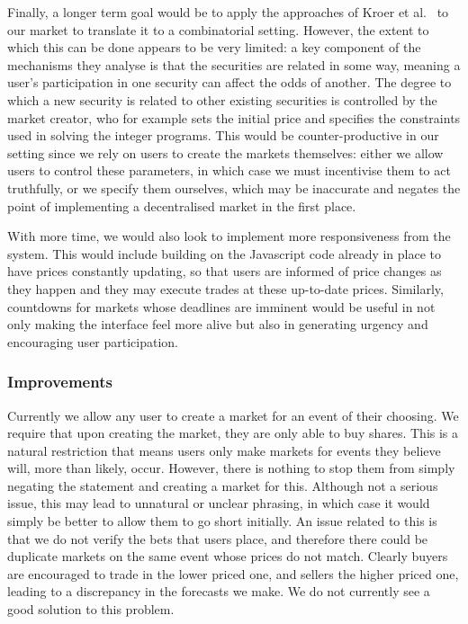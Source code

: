 Finally, a longer term goal would be to apply the approaches of Kroer et
al.~\cite{Kroer2016} to our market to translate it to a combinatorial setting.
However, the extent to which this can be done appears to be very limited: a key
component of the mechanisms they analyse is that the securities are related in
some way, meaning a user's participation in one security can affect the odds of
another. The degree to which a new security is related to other existing
securities is controlled by the market creator, who for example sets the
initial price and specifies the constraints used in solving the integer
programs. This would be counter-productive in our setting since we rely on
users to create the markets themselves: either we allow users to control these
parameters, in which case we must incentivise them to act truthfully, or we
specify them ourselves, which may be inaccurate and negates the point of
implementing a decentralised market in the first place.

With more time, we would also look to implement more responsiveness from the 
system. This would include building on the Javascript code already in place to
have prices constantly updating, so that users are informed of price changes as
they happen and they may execute trades at these up-to-date prices. Similarly,
countdowns for markets whose deadlines are imminent would be useful in not only
making the interface feel more alive but also in generating urgency and
encouraging user participation.

\subsubsection{Improvements}

Currently we allow any user to create a market for an event of their choosing.
We require that upon creating the market, they are only able to buy
shares. This is a natural restriction that means users only make markets for
events they believe will, more than likely, occur. However, there is nothing to
stop them from simply negating the statement and creating a market for this.
Although not a serious issue, this may lead to unnatural or unclear phrasing,
in which case it would simply be better to allow them to go short initially.
An issue related to this is that we do not verify the bets that users place,
and therefore there could be duplicate markets on the same event whose prices
do not match. Clearly buyers are encouraged to trade in the lower priced one,
and sellers the higher priced one, leading to a discrepancy in the forecasts we
make. We do not currently see a good solution to this problem.

